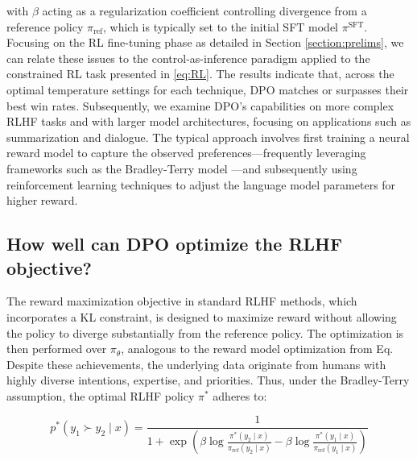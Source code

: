 with $\beta$ acting as a regularization coefficient controlling divergence from a reference policy $\pi_\text{ref}$, which is typically set to the initial SFT model $\pi^\text{SFT}$. Focusing on the RL fine-tuning phase as detailed in Section \ref{section:prelims}, we can relate these issues to the control-as-inference paradigm \cite{levine2018reinforcement} applied to the constrained RL task presented in \ref{eq:RL}. The results indicate that, across the optimal temperature settings for each technique, DPO matches or surpasses their best win rates. Subsequently, we examine DPO's capabilities on more complex RLHF tasks and with larger model architectures, focusing on applications such as summarization and dialogue. The typical approach involves first training a neural reward model to capture the observed preferences—frequently leveraging frameworks such as the Bradley-Terry model \citep{bradley1952rankanalysis}—and subsequently using reinforcement learning techniques to adjust the language model parameters for higher reward. \subsection{How well can DPO optimize the RLHF objective?}

The reward maximization objective in standard RLHF methods, which incorporates a KL constraint, is designed to maximize reward without allowing the policy to diverge substantially from the reference policy. The optimization is then performed over $\pi_\theta$, analogous to the reward model optimization from Eq. Despite these achievements, the underlying data originate from humans with highly diverse intentions, expertise, and priorities. Thus, under the Bradley-Terry assumption, the optimal RLHF policy $\pi^*$ adheres to:

\begin{equation}\label{eq:objective}
    p^*(y_1\succ y_2 \mid x)=\frac{1}{1 + \exp\left(\beta \log \frac{\pi^*(y_2\mid x)}{\pi_\text{ref}(y_2\mid x)} - \beta \log \frac{\pi^*(y_1\mid x)}{\pi_\text{ref}(y_1\mid x)}\right)}
\end{equation}

